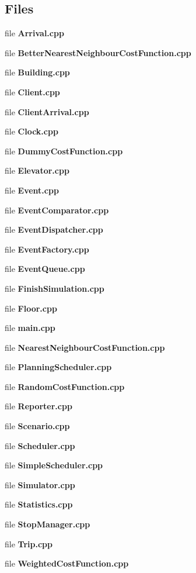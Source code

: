 \subsection*{Files}
\begin{DoxyCompactItemize}
\item 
file {\bf Arrival.\+cpp}
\item 
file {\bf Better\+Nearest\+Neighbour\+Cost\+Function.\+cpp}
\item 
file {\bf Building.\+cpp}
\item 
file {\bf Client.\+cpp}
\item 
file {\bf Client\+Arrival.\+cpp}
\item 
file {\bf Clock.\+cpp}
\item 
file {\bf Dummy\+Cost\+Function.\+cpp}
\item 
file {\bf Elevator.\+cpp}
\item 
file {\bf Event.\+cpp}
\item 
file {\bf Event\+Comparator.\+cpp}
\item 
file {\bf Event\+Dispatcher.\+cpp}
\item 
file {\bf Event\+Factory.\+cpp}
\item 
file {\bf Event\+Queue.\+cpp}
\item 
file {\bf Finish\+Simulation.\+cpp}
\item 
file {\bf Floor.\+cpp}
\item 
file {\bf main.\+cpp}
\item 
file {\bf Nearest\+Neighbour\+Cost\+Function.\+cpp}
\item 
file {\bf Planning\+Scheduler.\+cpp}
\item 
file {\bf Random\+Cost\+Function.\+cpp}
\item 
file {\bf Reporter.\+cpp}
\item 
file {\bf Scenario.\+cpp}
\item 
file {\bf Scheduler.\+cpp}
\item 
file {\bf Simple\+Scheduler.\+cpp}
\item 
file {\bf Simulator.\+cpp}
\item 
file {\bf Statistics.\+cpp}
\item 
file {\bf Stop\+Manager.\+cpp}
\item 
file {\bf Trip.\+cpp}
\item 
file {\bf Weighted\+Cost\+Function.\+cpp}
\end{DoxyCompactItemize}
